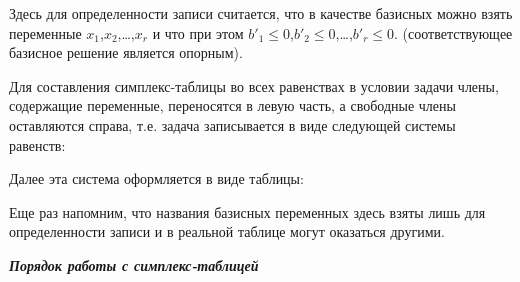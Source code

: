\documentclass{article}
\begin{document}
Здесь для определенности записи считается, что в качестве базисных можно взять переменные $x_1$,$x_2$,\dots,$x_r$ и что при этом $b'_1 \leq 0$,$b'_2 \leq 0$,\dots,$b'_r \leq 0$. (соответствующее  базисное решение является опорным).

Для составления симплекс-таблицы во всех равенствах в условии  задачи члены, содержащие переменные, переносятся в левую часть, а свободные члены оставляются справа, т.е. задача записывается в виде следующей системы равенств:

Далее эта система оформляется  в виде таблицы:

Еще раз напомним, что названия базисных переменных здесь взяты лишь для определенности записи и в реальной таблице могут оказаться другими.
\begin{center}
\textit{\textbf{Порядок работы с симплекс-таблицей}}
\end{center}
\end{document}
